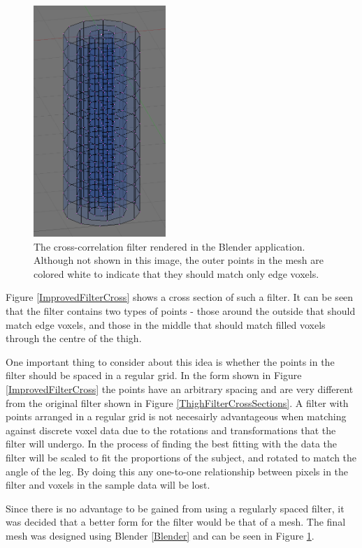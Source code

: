 \begin{figure}[tb]
	\centering
	\includegraphics[width=5cm]{thighmodel.png}
	\caption{The cross-correlation filter rendered in the Blender application.
		Although not shown in this image, the outer points in the mesh are colored white to indicate that they should
		match only edge voxels.}
	\label{ImprovedFilter}
\end{figure}

Figure \ref{ImprovedFilterCross} shows a cross section of such a filter.
It can be seen that the filter contains two types of points - those around the outside that should match edge voxels,
and those in the middle that should match filled voxels through the centre of the thigh.

One important thing to consider about this idea is whether the points in the filter should be spaced in a regular grid.
In the form shown in Figure \ref{ImprovedFilterCross} the points have an arbitrary spacing and are very different from the original filter shown in Figure \ref{ThighFilterCrossSections}.
A filter with points arranged in a regular grid is not necesairly advantageous when matching against discrete voxel data due to the rotations and transformations that the filter will undergo.
In the process of finding the best fitting with the data the filter will be scaled to fit the proportions of the subject, and rotated to match the angle of the leg.
By doing this any one-to-one relationship between pixels in the filter and voxels in the sample data will be lost.

Since there is no advantage to be gained from using a regularly spaced filter, it was decided that a better form for the filter would be that of a mesh.
The final mesh was designed using Blender \ref{Blender} and can be seen in Figure \ref{ImprovedFilter}.


